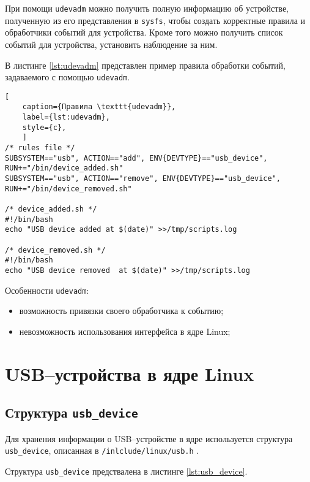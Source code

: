 При помощи \texttt{udevadm} можно получить полную информацию об устройстве, полученную из его представления в \texttt{sysfs}, чтобы создать корректные правила и обработчики событий для устройства. Кроме того можно получить список событий для устройства, установить наблюдение за ним.

В листинге \ref{lst:udevadm} представлен пример правила обработки событий, задаваемого с помощью \texttt{udevadm}.

\begin{lstlisting}[
	caption={Правила \texttt{udevadm}},
	label={lst:udevadm},
	style={c},
	]
/* rules file */
SUBSYSTEM=="usb", ACTION=="add", ENV{DEVTYPE}=="usb_device",  RUN+="/bin/device_added.sh"
SUBSYSTEM=="usb", ACTION=="remove", ENV{DEVTYPE}=="usb_device", RUN+="/bin/device_removed.sh"

/* device_added.sh */
#!/bin/bash
echo "USB device added at $(date)" >>/tmp/scripts.log

/* device_removed.sh */
#!/bin/bash
echo "USB device removed  at $(date)" >>/tmp/scripts.log
\end{lstlisting}

Особенности \texttt{udevadm}:

\begin{itemize}
	\item возможность привязки своего обработчика к событию;
	\item невозможность использования интерфейса в ядре Linux;
\end{itemize}

\section{USB--устройства в ядре Linux}

\subsection{Структура \texttt{usb\_device}}

Для хранения информации о USB--устройстве в ядре используется структура \texttt{usb\_device}, описанная в \texttt{/inlclude/linux/usb.h} \cite{usb_device}.

Структура \texttt{usb\_device} предствалена в листинге \ref{lst:usb_device}.

